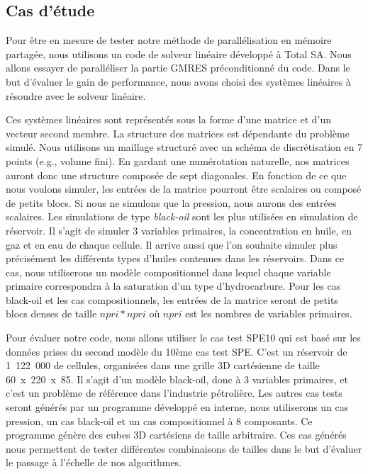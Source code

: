 \subsection{Cas d'étude}
Pour être en mesure de tester notre méthode de parallélisation en mémoire partagée, nous utilisons un code de solveur linéaire développé à Total SA.
%
Nous allons essayer de paralléliser la partie GMRES préconditionné du code.
%
Dans le but d'évaluer le gain de performance, nous avons choisi des systèmes linéaires à résoudre avec le solveur linéaire.


Ces systèmes linéaires sont représentés sous la forme d'une matrice et d'un vecteur second membre.
%
La structure des matrices est dépendante du problème simulé.
%
Nous utilisons un maillage structuré avec un schéma de discrétisation en 7 points (e.g., volume fini).
%
En gardant une numérotation naturelle, nos matrices auront donc une structure composée de sept diagonales.
%
En fonction de ce que nous voulons simuler, les entrées de la matrice pourront être scalaires ou composé de petits blocs.
%
Si nous ne simulons que la pression, nous aurons des entrées scalaires.
%
Les simulations de type {\em black-oil} sont les plus utilisées en simulation de réservoir.
%
Il s'agit de simuler 3 variables primaires, la concentration en huile, en gaz et en eau de chaque cellule.
%
Il arrive aussi que l'on souhaite simuler plus précisément les différents types d'huiles contenues dans les réservoirs.
%
Dans ce cas, nous utiliserons un modèle compositionnel dans lequel chaque variable primaire correspondra à la saturation d'un type d'hydrocarbure.
%
Pour les cas black-oil et les cas compositionnels, les entrées de la matrice seront de petits blocs denses de taille $npri*npri$ où $npri$ est les nombres de variables primaires.

Pour évaluer notre code, nous allons utiliser le cas test SPE10 qui est basé sur les données prises du second modèle du 10ème cas test SPE\cite{SPE10}.
%
C'est un réservoir de 1~122~000 de cellules, organisées dans une grille 3D cartésienne de taille 60~x~220~x~85.
%
Il s'agit d'un modèle black-oil, donc à 3 variables primaires, et c'est un problème de référence dans l'industrie pétrolière.
%
Les autres cas tests seront générés par un programme développé en interne, nous utiliserons un cas pression, un cas black-oil et un cas compositionnel à 8 composants.
%
Ce programme génère des cubes 3D cartésiens de taille arbitraire.
%
Ces cas générés nous permettent de tester différentes combinaisons de tailles dans le but d'évaluer le passage à l'échelle de nos algorithmes.

